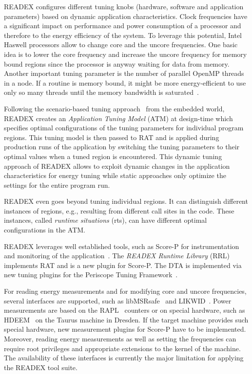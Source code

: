 \documentclass[runningheads]{llncs}
\begin{document}
READEX configures different tuning knobs (hardware, software and application parameters) based on dynamic application characteristics. Clock frequencies have a significant impact on performance and power consumption of a processor and therefore to the energy efficiency of the system. To leverage this potential, Intel Haswell processors allow to change core and the uncore frequencies. One basic idea is to lower the core frequency and increase the uncore frequency for memory bound regions since the processor is anyway waiting for data from memory. Another important tuning parameter is the number of parallel OpenMP threads in a node. If a routine is memory bound, it might be more energy-efficient to use only so many threads until the memory bandwidth is saturated~\cite{rs_hotpower12}.

Following the scenario-based tuning approach~\cite{filippopoulos2013exploration} from the embedded world, READEX creates an \textit{Application Tuning Model} (ATM) at design-time which specifies optimal configurations of the tuning parameters for individual program regions. This tuning model is then passed to RAT and is applied during production runs of the application by switching the tuning parameters to their optimal values when a tuned region is encountered. This dynamic tuning approach of READEX allows to exploit dynamic changes in the application characteristics for energy tuning while static approaches only optimize the settings for the entire program run. 

READEX even goes beyond tuning individual regions. It can distinguish different instances of regions, e.g., resulting from different call sites in the code. These instances, called \textit{runtime situations} (rts), can have different optimal configurations in the ATM. 

READEX leverages well established tools, such as Score-P for instrumentation and monitoring of the application~\cite{knupfer2012score}. The \textit{READEX Runtime Library} (RRL) implements RAT and is a new plugin for Score-P. The DTA is implemented via new tuning plugins for the Periscope Tuning Framework~\cite{PTF2.0IEEE2016}.  

For reading energy measurements and for modifying core and uncore frequencies, several interfaces are supported, such as libMSRsafe~\cite{msrsave} and LIKWID~\cite{LIKWID}. Power measurements are based on the RAPL~\cite{Intel2018} counters or on special hardware, such as HDEEM~\cite{hdeem} on the Taurus machine in Dresden. If the target machine provides such special hardware, new measurement plugins for Score-P have to be implemented. Moreover, reading energy measurements as well as setting the frequencies can require root privileges and appropriate extensions to the kernel of the machine. The availability of these interfaces is currently the major limitation for applying the READEX tool suite. 
\end{document}

